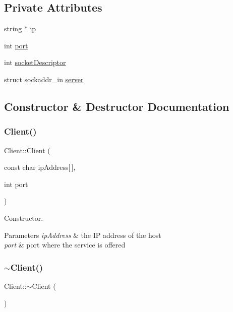 \subsection*{Private Attributes}
\begin{DoxyCompactItemize}
\item 
string $\ast$ \mbox{\hyperlink{classClient_a0dcc58589f647de09ac3bb9b0c047344}{ip}}
\item 
int \mbox{\hyperlink{classClient_aad8864d1362eae7c50e53c0d131b7442}{port}}
\item 
int \mbox{\hyperlink{classClient_a9f98046d3d62a69810a59430cd88992e}{socket\+Descriptor}}
\item 
struct sockaddr\+\_\+in \mbox{\hyperlink{classClient_a5a642940108c175ea6ce84fa121a0a09}{server}}
\end{DoxyCompactItemize}


\subsection{Constructor \& Destructor Documentation}
\mbox{\label{classClient_a0c36ffb481052708297b939e8e8987e6}} 
\subsubsection{\texorpdfstring{Client()}{Client()}}
{\footnotesize\ttfamily Client\+::\+Client (\begin{DoxyParamCaption}\item[{const char}]{ip\+Address\mbox{[}$\,$\mbox{]},  }\item[{int}]{port }\end{DoxyParamCaption})}

Constructor. 
\begin{DoxyParams}{Parameters}
{\em ip\+Address} & the IP address of the host \\
\hline
{\em port} & port where the service is offered \\
\hline
\end{DoxyParams}
\mbox{\label{classClient_a840e519ca781888cbd54181572ebe3a7}} 
\subsubsection{\texorpdfstring{$\sim$\+Client()}{~Client()}}
{\footnotesize\ttfamily Client\+::$\sim$\+Client (\begin{DoxyParamCaption}{ }\end{DoxyParamCaption})}

